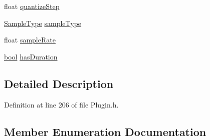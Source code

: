 \begin{DoxyCompactItemize}
\item 
float \hyperlink{struct_vamp_1_1_plugin_1_1_output_descriptor_a3bed37153067b625b95acb40b60dbf0b}{quantize\+Step}
\item 
\hyperlink{struct_vamp_1_1_plugin_1_1_output_descriptor_abffa9ed50cd756df70fd51f0355f448c}{Sample\+Type} \hyperlink{struct_vamp_1_1_plugin_1_1_output_descriptor_a0d1194980d44e31b25ef3b4b070d6b5d}{sample\+Type}
\item 
float \hyperlink{struct_vamp_1_1_plugin_1_1_output_descriptor_add0cbbdfa9c91764037c39365b1d42af}{sample\+Rate}
\item 
\hyperlink{mac_2config_2i386_2lib-src_2libsoxr_2soxr-config_8h_abb452686968e48b67397da5f97445f5b}{bool} \hyperlink{struct_vamp_1_1_plugin_1_1_output_descriptor_ab0d7cc6ab19e53b5bd12ee234f549ea3}{has\+Duration}
\end{DoxyCompactItemize}


\subsection{Detailed Description}


Definition at line 206 of file Plugin.\+h.



\subsection{Member Enumeration Documentation}

